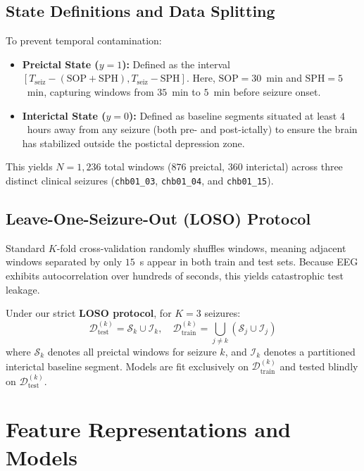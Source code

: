 \documentclass[10pt,journal,compsoc]{IEEEtran}
\begin{document}
\subsection{State Definitions and Data Splitting}
To prevent temporal contamination:
\begin{itemize}
    \item \textbf{Preictal State ($y=1$):} Defined as the interval $[T_{\text{seiz}} - (\text{SOP} + \text{SPH}), T_{\text{seiz}} - \text{SPH}]$. Here, $\text{SOP} = 30$~min and $\text{SPH} = 5$~min, capturing windows from $35$~min to $5$~min before seizure onset.
    \item \textbf{Interictal State ($y=0$):} Defined as baseline segments situated at least $4$~hours away from any seizure (both pre- and post-ictally) to ensure the brain has stabilized outside the postictal depression zone.
\end{itemize}

This yields $N = 1{,}236$ total windows ($876$ preictal, $360$ interictal) across three distinct clinical seizures (\texttt{chb01\_03}, \texttt{chb01\_04}, and \texttt{chb01\_15}).

\subsection{Leave-One-Seizure-Out (LOSO) Protocol}
Standard $K$-fold cross-validation randomly shuffles windows, meaning adjacent windows separated by only $15$~s appear in both train and test sets. Because EEG exhibits autocorrelation over hundreds of seconds, this yields catastrophic test leakage. 

Under our strict \textbf{LOSO protocol}, for $K=3$ seizures:
\begin{equation}
    \mathcal{D}_{\text{test}}^{(k)} = \mathcal{S}_k \cup \mathcal{I}_k, \quad \mathcal{D}_{\text{train}}^{(k)} = \bigcup_{j \ne k} (\mathcal{S}_j \cup \mathcal{I}_j)
\end{equation}
where $\mathcal{S}_k$ denotes all preictal windows for seizure $k$, and $\mathcal{I}_k$ denotes a partitioned interictal baseline segment. Models are fit exclusively on $\mathcal{D}_{\text{train}}^{(k)}$ and tested blindly on $\mathcal{D}_{\text{test}}^{(k)}$.

\section{Feature Representations and Models}
\end{document}
